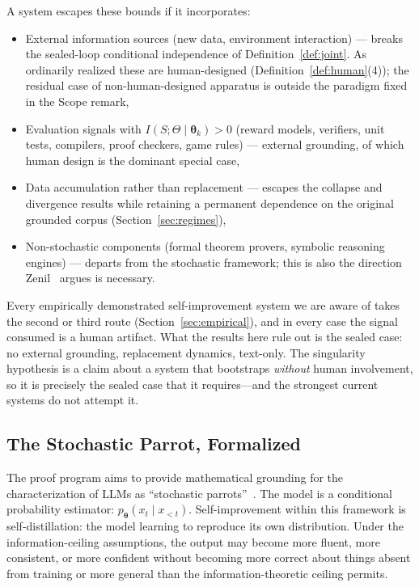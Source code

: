 \documentclass[11pt,a4paper]{article}
\begin{document}
A system escapes these bounds if it incorporates:
\begin{itemize}
    \item External information sources (new data, environment interaction) --- breaks the sealed-loop conditional independence of Definition~\ref{def:joint}. As ordinarily realized these are human-designed (Definition~\ref{def:human}(4)); the residual case of non-human-designed apparatus is outside the paradigm fixed in the Scope remark,
    \item Evaluation signals with $I(S;\Theta \mid \bm{\theta}_k) > 0$ (reward models, verifiers, unit tests, compilers, proof checkers, game rules) --- external grounding, of which human design is the dominant special case,
    \item Data accumulation rather than replacement --- escapes the collapse and divergence results while retaining a permanent dependence on the original grounded corpus (Section~\ref{sec:regimes}),
    \item Non-stochastic components (formal theorem provers, symbolic reasoning engines) --- departs from the stochastic framework; this is also the direction Zenil~\cite{limitsself2025} argues is necessary.
\end{itemize}
Every empirically demonstrated self-improvement system we are aware of takes the second or third route (Section~\ref{sec:empirical}), and in every case the signal consumed is a human artifact. What the results here rule out is the sealed case: no external grounding, replacement dynamics, text-only. The singularity hypothesis is a claim about a system that bootstraps \emph{without} human involvement, so it is precisely the sealed case that it requires---and the strongest current systems do not attempt it.

\subsection{The Stochastic Parrot, Formalized}

The proof program aims to provide mathematical grounding for the characterization of LLMs as ``stochastic parrots''~\cite{bender2021stochastic}. The model is a conditional probability estimator: $p_{\bm{\theta}}(x_t \mid x_{<t})$. Self-improvement within this framework is self-distillation: the model learning to reproduce its own distribution. Under the information-ceiling assumptions, the output may become more fluent, more consistent, or more confident without becoming more correct about things absent from training or more general than the information-theoretic ceiling permits.
\end{document}
